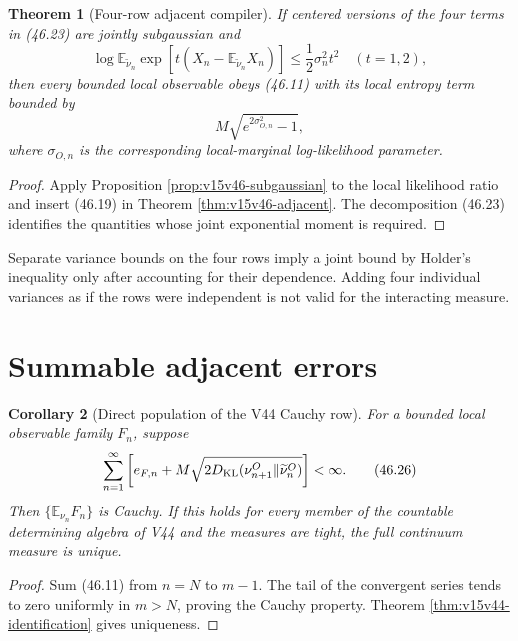 \documentclass[11pt]{article}
\newtheorem{theorem}{Theorem}[section]
\newtheorem{corollary}[theorem]{Corollary}
\theoremstyle{remark}
\begin{document}
\begin{theorem}[Four-row adjacent compiler]
\label{thm:v15v46-four-row}
If centered versions of the four terms in (46.23) are jointly
subgaussian and
\[
 \log\mathbb E_{\widetilde\nu_n}
 \exp\left[
 t\left(X_n-\mathbb E_{\widetilde\nu_n}X_n\right)\right]
 \leq\frac12\sigma_n^2t^2
 \quad(t=1,2),                                          \tag{46.24}
\]
then every bounded local observable obeys (46.11) with its local
entropy term bounded by
\[
 M\sqrt{e^{2\sigma_{O,n}^2}-1},                         \tag{46.25}
\]
where \(\sigma_{O,n}\) is the corresponding local-marginal
log-likelihood parameter.
\end{theorem}

\begin{proof}
Apply Proposition \ref{prop:v15v46-subgaussian} to the local
likelihood ratio and insert (46.19) in Theorem
\ref{thm:v15v46-adjacent}.  The decomposition (46.23) identifies
the quantities whose joint exponential moment is required.
\end{proof}

Separate variance bounds on the four rows imply a joint bound by
Holder's inequality only after accounting for their dependence.
Adding four individual variances as if the rows were independent is
not valid for the interacting measure.

\section{Summable adjacent errors}

\begin{corollary}[Direct population of the V44 Cauchy row]
\label{cor:v15v46-summable}
For a bounded local observable family \(F_n\), suppose
\[
 \sum_{n=1}^\infty
 \left[
 e_{F,n}
 +M\sqrt{2D_{\rm KL}(\nu_{n+1}^O
                     \Vert\widetilde\nu_n^O)}
 \right]<\infty.                                        \tag{46.26}
\]
Then \(\{\mathbb E_{\nu_n}F_n\}\) is Cauchy.  If this holds for
every member of the countable determining algebra of V44 and the
measures are tight, the full continuum measure is unique.
\end{corollary}

\begin{proof}
Sum (46.11) from \(n=N\) to \(m-1\).  The tail of the convergent
series tends to zero uniformly in \(m>N\), proving the Cauchy
property.  Theorem \ref{thm:v15v44-identification} gives uniqueness.
\end{proof}
\end{document}
